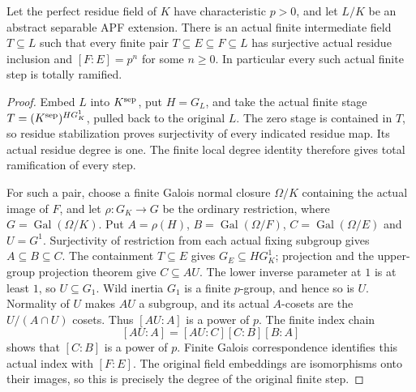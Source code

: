 \begin{lemma}
\label{fw:apf-wild-finite-tail}
\leanok
Let the perfect residue field of $K$ have characteristic $p>0$,
and let $L/K$ be an abstract separable APF extension.
There is an actual finite intermediate field $T\subseteq L$
such that every finite pair $T\subseteq E\subseteq F\subseteq L$
has surjective actual residue inclusion and $[F:E]=p^n$ for
some $n\geq0$. In particular every such actual finite step is
totally ramified.
\end{lemma}
\begin{proof}
Embed $L$ into $K^{\rm sep}$, put $H=G_L$, and take the actual
finite stage $T=(K^{\rm sep})^{HG_K^1}$, pulled back to the
original $L$. The zero stage is contained in $T$, so residue
stabilization proves surjectivity of every indicated residue map.
Its actual residue degree is one. The finite local degree identity
therefore gives total ramification of every step.

For such a pair, choose a finite Galois normal closure $\Omega/K$
containing the actual image of $F$, and let $\rho:G_K\to G$ be
the ordinary restriction, where $G=\operatorname{Gal}(\Omega/K)$.
Put $A=\rho(H)$, $B=\operatorname{Gal}(\Omega/F)$,
$C=\operatorname{Gal}(\Omega/E)$ and $U=G^1$.
Surjectivity of restriction from each actual fixing subgroup gives
$A\subseteq B\subseteq C$. The containment $T\subseteq E$
gives $G_E\subseteq HG_K^1$; projection and the upper-group
projection theorem give $C\subseteq AU$.
The lower inverse parameter at $1$ is at least $1$, so
$U\subseteq G_1$. Wild inertia $G_1$ is a finite $p$-group,
and hence so is $U$. Normality of $U$ makes $AU$ a subgroup,
and its actual $A$-cosets are the $U/(A\cap U)$ cosets.
Thus $[AU:A]$ is a power of $p$. The finite index chain
\[
 [AU:A]=[AU:C][C:B][B:A]
\]
shows that $[C:B]$ is a power of $p$. Finite Galois
correspondence identifies this actual index with $[F:E]$.
The original field embeddings are isomorphisms onto their images,
so this is precisely the degree of the original finite step.
\end{proof}

